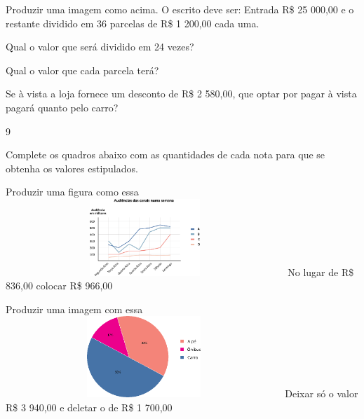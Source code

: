 Produzir uma imagem como acima. O escrito deve ser: Entrada R\$ 25 000,00
e o restante dividido em 36 parcelas de R\$ 1 200,00 cada uma.

\begin{escolha}

\item
  Qual o valor que será dividido em 24 vezes?

\item
  Qual o valor que cada parcela terá?

\item
  Se à vista a loja fornece um desconto de R\$ 2 580,00, que optar por
  pagar à vista pagará quanto pelo carro?
\end{escolha}


\num{9}

Complete os quadros abaixo com as quantidades de cada nota para que se
obtenha os valores estipulados.

\begin{escolha}

\item
  Produzir uma figura como essa
\includegraphics[width=4.14203in,height=1.14177in]{media/image77.png}
No lugar de R\$ 836,00 colocar R\$ 966,00


\item
  Produzir uma imagem com essa
\includegraphics[width=4.10036in,height=1.20844in]{media/image78.png}
Deixar só o valor R\$ 3 940,00 e deletar o de R\$ 1 700,00
\end{escolha}


